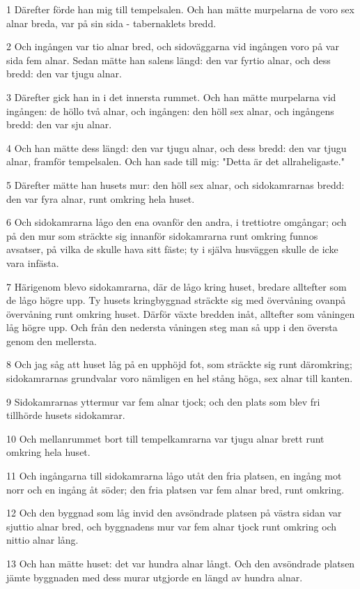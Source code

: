 \par 1 Därefter förde han mig till tempelsalen. Och han mätte murpelarna de voro sex alnar breda, var på sin sida - tabernaklets bredd.
\par 2 Och ingången var tio alnar bred, och sidoväggarna vid ingången voro på var sida fem alnar. Sedan mätte han salens längd: den var fyrtio alnar, och dess bredd: den var tjugu alnar.
\par 3 Därefter gick han in i det innersta rummet. Och han mätte murpelarna vid ingången: de höllo två alnar, och ingången: den höll sex alnar, och ingångens bredd: den var sju alnar.
\par 4 Och han mätte dess längd: den var tjugu alnar, och dess bredd: den var tjugu alnar, framför tempelsalen. Och han sade till mig: "Detta är det allraheligaste."
\par 5 Därefter mätte han husets mur: den höll sex alnar, och sidokamrarnas bredd: den var fyra alnar, runt omkring hela huset.
\par 6 Och sidokamrarna lågo den ena ovanför den andra, i trettiotre omgångar; och på den mur som sträckte sig innanför sidokamrarna runt omkring funnos avsatser, på vilka de skulle hava sitt fäste; ty i själva husväggen skulle de icke vara infästa.
\par 7 Härigenom blevo sidokamrarna, där de lågo kring huset, bredare alltefter som de lågo högre upp. Ty husets kringbyggnad sträckte sig med övervåning ovanpå övervåning runt omkring huset. Därför växte bredden inåt, alltefter som våningen låg högre upp. Och från den nedersta våningen steg man så upp i den översta genom den mellersta.
\par 8 Och jag såg att huset låg på en upphöjd fot, som sträckte sig runt däromkring; sidokamrarnas grundvalar voro nämligen en hel stång höga, sex alnar till kanten.
\par 9 Sidokamrarnas yttermur var fem alnar tjock; och den plats som blev fri tillhörde husets sidokamrar.
\par 10 Och mellanrummet bort till tempelkamrarna var tjugu alnar brett runt omkring hela huset.
\par 11 Och ingångarna till sidokamrarna lågo utåt den fria platsen, en ingång mot norr och en ingång åt söder; den fria platsen var fem alnar bred, runt omkring.
\par 12 Och den byggnad som låg invid den avsöndrade platsen på västra sidan var sjuttio alnar bred, och byggnadens mur var fem alnar tjock runt omkring och nittio alnar lång.
\par 13 Och han mätte huset: det var hundra alnar långt. Och den avsöndrade platsen jämte byggnaden med dess murar utgjorde en längd av hundra alnar.

